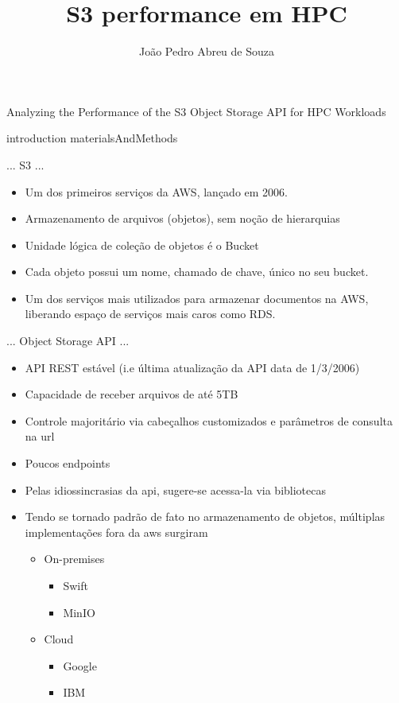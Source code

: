\documentclass{beamer}
\title{S3 performance em HPC}
\author{João Pedro Abreu de Souza}
\begin{document}
\begin{frame}{Analyzing the Performance of the S3 Object Storage API for HPC Workloads}
\end{frame}
{introduction}
{materialsAndMethods}
\begin{frame}{... S3 ...}
	\begin{itemize}
		\item 	Um dos primeiros serviços da AWS, lançado em 2006.
		\pause
		\item	Armazenamento de arquivos (objetos), sem noção de hierarquias
		\pause
		\item	Unidade lógica de coleção de objetos é o Bucket
		\pause
		\item	Cada objeto possui um nome, chamado de chave, único no seu bucket.
		\pause
		\item	Um dos serviços mais utilizados para armazenar documentos na AWS, liberando espaço de serviços mais caros como RDS.
	\end{itemize}
\end{frame}
\begin{frame}{... Object Storage API ...}
	\begin{itemize}
		\item API REST estável (i.e última atualização da API data de 1/3/2006)
		\pause
		\item Capacidade de receber arquivos de até 5TB
		\pause
		\item Controle majoritário via cabeçalhos customizados e parâmetros de consulta na url
		\pause
		\item Poucos endpoints
		\pause
		\item Pelas idiossincrasias da api, sugere-se acessa-la via bibliotecas
		\pause
		\item Tendo se tornado padrão de fato no armazenamento de objetos, múltiplas implementações fora da aws surgiram
		\begin{itemize}
			\item On-premises
				\begin{itemize}
					\item Swift
					\item MinIO
				\end{itemize}
			\item Cloud
				\begin{itemize}
					\item Google
					\item IBM
				\end{itemize}
		\end{itemize}
	\end{itemize}
\end{frame}
\end{document}

